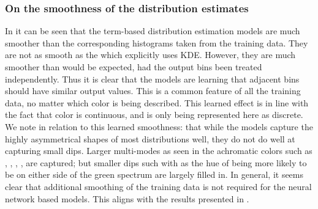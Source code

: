\documentclass[11pt,a4paper]{article}
\begin{document}
\subsubsection{On the smoothness of the distribution estimates}\label{sec:learnedsmoothness}
In  it can be seen that the term-based distribution estimation models are much smoother than the corresponding histograms taken from the  training data.
They are not as smooth as the \empmodel{} which explicitly uses KDE.
However, they are much smoother than would be expected, had the output bins been treated independently.
Thus it is clear that the models are learning that adjacent bins should have similar output values.
This is a common feature of all the training data, no matter which color is being described.
This learned effect is in line with the fact that color is continuous, and is only being represented here as discrete.
We note in relation to this learned smoothness: that while the models capture the highly asymmetrical shapes of most distributions well, they do not do well at capturing small dips.
Larger multi-modes as seen in the achromatic colors such as , , , , are captured; but smaller dips such with as the hue of  being more likely to be on either side of the green spectrum are largely filled in.
In general, it seems clear that additional smoothing of the training data is not required for the neural network based models.
This aligns with the results presented in .




\end{document}
